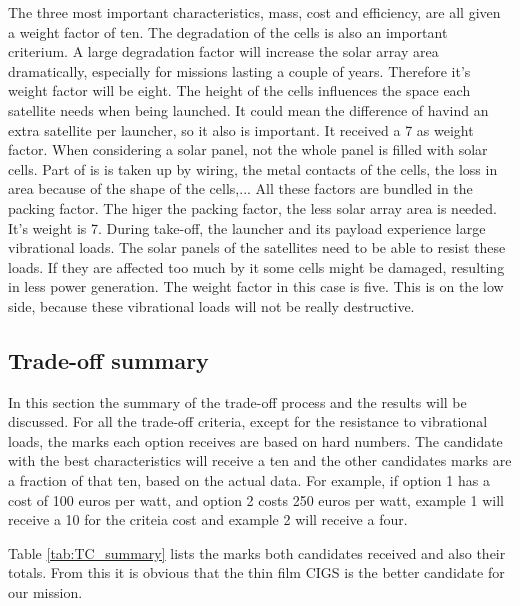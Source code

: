 The three most important characteristics, mass, cost and efficiency, are all given a weight factor of ten. The degradation of the cells is also an important criterium. A large degradation factor will increase the solar array area dramatically, especially for missions lasting a couple of years. Therefore it's weight factor will be eight. The height of the cells influences the space each satellite needs when being launched. It could mean the difference of havind an extra satellite per launcher, so it also is important. It received a 7 as weight factor.
When considering a solar panel, not the whole panel is filled with solar cells. Part of is is taken up by wiring, the metal contacts of the cells, the loss in area because of the shape of the cells,... All these factors are bundled in the packing factor. The higer the packing factor, the less solar array area is needed. It's weight is 7.
During take-off, the launcher and its payload experience large vibrational loads. The solar panels of the satellites need to be able to resist these loads. If they are affected too much by it some cells might be damaged, resulting in less power generation. The weight factor in this case is five. This is on the low side, because these vibrational loads will not be really destructive. 

\subsection{Trade-off summary}
In this section the summary of the trade-off process and the results will be discussed. For all the trade-off criteria, except for the resistance to vibrational loads, the marks each option receives are based on hard numbers. The candidate with the best characteristics will receive a ten and the other candidates marks are a fraction of that ten, based on the actual data. For example, if option 1 has a cost of 100 euros per watt, and option 2 costs 250 euros per watt, example 1 will receive a 10 for the criteia cost and example 2 will receive a four.

Table \ref{tab:TC_summary} lists the marks both candidates received and also their totals. From this it is obvious that the thin film CIGS is the better candidate for our mission.

